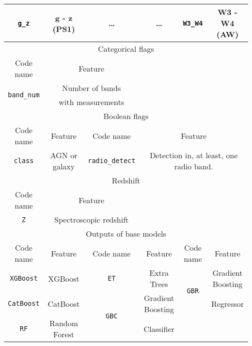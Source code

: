 \documentclass{aa}
\begin{document}
\begin{appendix}
\begin{table}
{\begin{tabular}{c c c c c c}
\texttt{g\_z}    & g - z (PS1) & \ldots & \ldots & \texttt{W3\_W4} & W3 - W4 (AW) \\[0.25em]
\hline\hline                 %
\multicolumn{6}{c}{Categorical flags} \\
Code name                           & \multicolumn{2}{c}{Feature}           &   &   &   \\
\hline
\multirow{2}{*}{\texttt{band\_num}} & \multicolumn{2}{c}{Number of bands}   &   &   &   \\
                                    & \multicolumn{2}{c}{with measurements} &   &   &   \\[0.25em]
\hline\hline                 %
\multicolumn{6}{c}{Boolean flags} \\
Code name       & Feature       & Code name                 & \multicolumn{3}{c}{Feature}                                   \\
\hline
\texttt{class}  & AGN or galaxy & \texttt{radio\_detect}    & \multicolumn{3}{c}{Detection in, at least, one radio band.}   \\[0.25em]
\hline\hline                 %
\multicolumn{6}{c}{Redshift} \\
Code name   & \multicolumn{2}{c}{Feature}                   &   &   &   \\
\hline
\texttt{Z}  & \multicolumn{2}{c}{Spectroscopic redshift}    &   &   &   \\[0.25em]
\hline\hline                 %
\multicolumn{6}{c}{Outputs of base models} \\
Code name           & Feature       & Code name                     & Feature           & Code name                     & Feature           \\
\hline
\texttt{XGBoost}    & XGBoost       & \texttt{ET}                   & Extra Trees       & \multirow{2}{*}{\texttt{GBR}} & Gradient Boosting \\
\texttt{CatBoost}   & CatBoost      & \multirow{2}{*}{\texttt{GBC}} & Gradient Boosting &                               & Regressor         \\
\texttt{RF}         & Random Forest &                               & Classifier        &                               &                   \\
\hline                                   %
\end{tabular}
}
\end{table}



\end{appendix}
\end{document}
